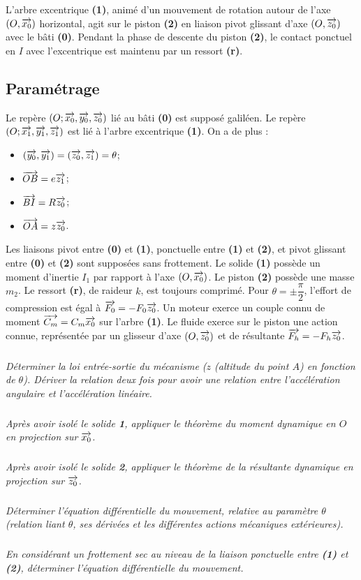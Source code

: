 \documentclass[10pt,fleqn]{article} %
\begin{document}
\begin{multicols}{2}
L'arbre excentrique \textbf{(1)}, animé d'un mouvement de rotation autour de l'axe $\left(O,\overrightarrow{x_0}\right)$  horizontal, agit sur le piston \textbf{(2)} en liaison pivot glissant d'axe $\left(O,\overrightarrow{z_0}\right)$ avec le bâti \textbf{(0)}. Pendant la phase de descente du piston \textbf{(2)}, le contact ponctuel en $I$ avec l’excentrique est maintenu par un ressort \textbf{(r)}.

\subsection*{Paramétrage}
Le repère $\left(O;\overrightarrow{x_0},\overrightarrow{y_0},\overrightarrow{z_0} \right)$ lié au bâti \textbf{(0)} est supposé galiléen.
Le repère $\left(O;\overrightarrow{x_1},\overrightarrow{y_1},\overrightarrow{z_1} \right)$ est lié à l'arbre excentrique \textbf{(1)}.
On a de plus :
\begin{itemize}
\item $\left(\overrightarrow{y_0},\overrightarrow{y_1}\right)=\left(\overrightarrow{z_0},\overrightarrow{z_1}\right)=\theta$;
\item $\overrightarrow{OB}=e\overrightarrow{z_1}$;
\item $\overrightarrow{BI}=R\overrightarrow{z_0}$;
\item $\overrightarrow{OA}=z\overrightarrow{z_0}$. 
\end{itemize} 	 	 		 
Les liaisons pivot entre \textbf{(0)} et \textbf{(1)}, ponctuelle entre \textbf{(1)} et \textbf{(2)}, et pivot glissant entre \textbf{(0)} et \textbf{(2)} sont supposées sans frottement.
Le solide \textbf{(1)} possède un moment d’inertie $I_1$ par rapport à l'axe $\left(O,\overrightarrow{x_0}\right)$. Le piston \textbf{(2)} possède une masse $m_2$.
Le ressort \textbf{(r)}, de raideur $k$, est toujours comprimé. Pour $\theta = \pm \dfrac{\pi}{2}$, l'effort de compression est égal à $\overrightarrow{F_0}=-F_0\overrightarrow{z_0}$.
Un moteur exerce un couple connu de moment $\overrightarrow{C_m}=C_m\overrightarrow{x_0}$ sur l'arbre \textbf{(1)}. Le fluide exerce sur le piston une action connue, représentée par un glisseur d'axe $\left(O,\overrightarrow{z_0}\right)$ et de résultante $\overrightarrow{F_h}=-F_h{\overrightarrow{z_0}}$.

\subparagraph{}\textit{Déterminer la loi entrée-sortie du mécanisme ($z$ (altitude du point $A$) en fonction de $\theta$). Dériver la relation deux fois pour avoir une relation entre l'accélération angulaire et l'accélération linéaire.}
\subparagraph{}\textit{Après avoir isolé le solide \textbf{1}, appliquer le théorème du moment dynamique en $O$ en projection sur $\overrightarrow{x_0}$.}
\subparagraph{}\textit{Après avoir isolé le solide \textbf{2}, appliquer le théorème de la résultante dynamique en projection sur $\overrightarrow{z_0}$.}
\subparagraph{}\textit{Déterminer l'équation différentielle du mouvement, relative au paramètre $\theta$ (relation liant $\theta$, ses dérivées et les différentes actions mécaniques extérieures).}


\subparagraph{}\textit{En considérant un frottement sec au niveau de la liaison ponctuelle entre \textbf{(1)} et \textbf{(2)}, déterminer l'équation différentielle du mouvement.}


\ifprof
\else
\end{multicols}
\fi
\end{document}
